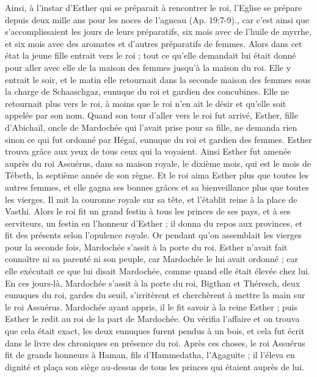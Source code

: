 \begin{multicols}{2}
{Ainsi, à l’instar d’Esther qui se préparait à rencontrer le roi, l’Eglise se prépare depuis deux mille ans pour les noces de l’agneau (Ap. 19:7-9).}, car c’est ainsi que s’accomplissaient les jours de leurs préparatifs, six mois avec de l’huile de myrrhe, et six mois avec des aromates et d’autres préparatifs de femmes.
 Alors dans cet état la jeune fille entrait vers le roi ; tout ce qu’elle demandait lui était donné pour aller avec elle de la maison des femmes jusqu’à la maison du roi.
Elle y entrait le soir, et le matin elle retournait dans la seconde maison des femmes sous la charge de Schaaschgaz, eunuque du roi et gardien des concubines. Elle ne retournait plus vers le roi, à moins que le roi n’en ait le désir et qu'elle soit appelée par son nom.
Quand son tour d’aller vers le roi fut arrivé, Esther, fille d'Abichaïl, oncle de Mardochée qui l’avait prise pour sa fille, ne demanda rien sinon ce qui fut ordonné par Hégaï, eunuque du roi et gardien des femmes. Esther trouva grâce aux yeux de tous ceux qui la voyaient.
Ainsi Esther fut amenée auprès du roi Assuérus, dans sa maison royale, le dixième mois, qui est le mois de Tébeth, la septième année de son règne.
Et le roi aima Esther plus que toutes les autres femmes, et elle gagna ses bonnes grâces et sa bienveillance plus que toutes les vierges. Il mit la couronne royale sur sa tête, et l'établit reine à la place de Vasthi.
Alors le roi fit un grand festin à tous les princes de ses pays, et à ses serviteurs, un festin en l’honneur d'Esther ; il donna du repos aux provinces, et fit des présents selon l’opulence royale.
Or pendant qu'on assemblait les vierges pour la seconde fois, Mardochée s’assit à la porte du roi.
Esther n’avait fait connaître ni sa parenté ni son peuple, car Mardochée le lui avait ordonné ; car elle exécutait ce que lui disait Mardochée, comme quand elle était élevée chez lui.
En ces jours-là, Mardochée s’assit à la porte du roi, Bigthan et Théresch, deux eunuques du roi, gardes du seuil, s’irritèrent et cherchèrent à mettre la main sur le roi Assuérus.
Mardochée ayant appris, il le fit savoir à la reine Esther ; puis Esther le redit au roi de la part de Mardochée.
On vérifia l’affaire et on trouva que cela était exact, les deux eunuques furent pendus à un bois, et cela fut écrit dans le livre des chroniques en présence du roi.
\VerseOne{}Après ces choses, le roi Assuérus fit de grands honneurs à Haman, fils d'Hammedatha, l’Agaguite ; il l'éleva en dignité et plaça son siège au-dessus de tous les princes qui étaient auprès de lui.

\end{multicols}
